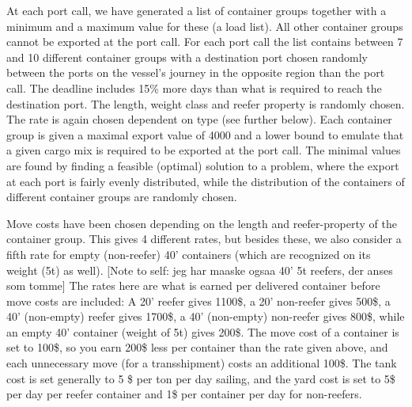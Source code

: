 At each port call, we have generated a list of container groups together with a minimum and a maximum value for these (a load list). All other container groups cannot be exported at the port call. For each port call the list contains between 7 and 10 different container groups with a destination port chosen randomly between the ports on the vessel's journey in the opposite region than the port call. The deadline includes 15\% more days than what is required to reach the destination port. The length, weight class and reefer property is randomly chosen. The rate is again chosen dependent on type (see further below).  
Each container group is given a maximal export value of 4000 and a lower bound to emulate that a given cargo mix is required to be exported at the port call. The minimal values are found by finding a feasible (optimal) solution to a problem, where the export at each port is fairly evenly distributed, while the distribution of the containers of different container groups are randomly chosen. 

Move costs have been chosen depending on the length and reefer-property of the container group. This gives 4 different rates, but besides these, we also consider a fifth rate for empty (non-reefer) 40' containers (which are recognized on its weight (5t) as well). [Note to self: jeg har maaske ogsaa 40' 5t reefers, der anses som tomme]
The rates here are what is earned per delivered container before move costs are included: A 20' reefer gives 1100\$, a 20' non-reefer gives 500\$, a 40' (non-empty) reefer gives 1700\$, a 40' (non-empty) non-reefer gives 800\$, while an empty 40' container (weight of 5t) gives 200\$. The move cost of a container is set to 100\$, so you earn 200\$ less per container than the rate given above, and each unnecessary move (for a transshipment) costs an additional 100\$. The tank cost is set generally to 5 \$ per ton per day sailing, and the yard cost is set to 5\$ per day per reefer container and 1\$ per container per day for non-reefers.

